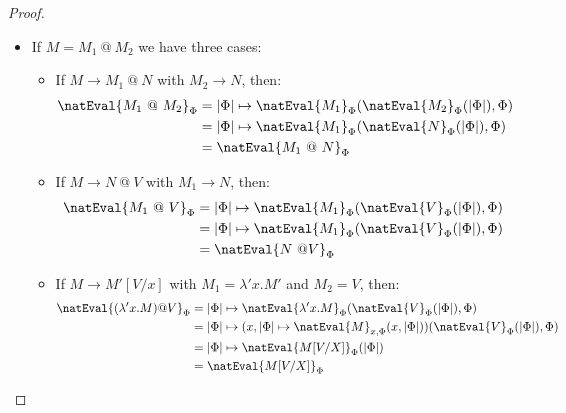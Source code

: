 \begin{proof}
\begin{itemize}
        \item If $M= M_1\ @\ M_2$ we have three cases:
        \begin{itemize}
            \item If $M\to M_1\ @\ N$ with $M_2\to N$, then: 
            \begin{align*}
            \natEval{M_1\ @\ M_2}_\Phi &= |\Phi| \mapsto \natEval{M_1}_\Phi(\natEval{M_2}_\Phi(|\Phi|), \Phi)\\
            &= |\Phi| \mapsto \natEval{M_1}_\Phi(\natEval{N}_\Phi(|\Phi|), \Phi)\\
            &= \natEval{M_1\ @\ N}_\Phi
            \end{align*}

            \item If $M\to N\ @\ V$ with $M_1\to N$, then: 
            \begin{align*}
            \natEval{M_1\ @\ V}_\Phi &= |\Phi| \mapsto \natEval{M_1}_\Phi(\natEval{V}_\Phi(|\Phi|), \Phi)\\
            &= |\Phi| \mapsto \natEval{M_1}_\Phi(\natEval{V}_\Phi(|\Phi|), \Phi)\\
            &= \natEval{N\ @ V}_\Phi
            \end{align*}

            \item If $M\to M'[V/x]$ with $M_1 = \lambda' x.M'$ and $M_2 = V$, then: 
            \begin{align*}
            \natEval{(\lambda' x.M)@ V}_\Phi &= |\Phi| \mapsto \natEval{\lambda' x.M}_\Phi(\natEval{V}_\Phi(|\Phi|), \Phi)\\
            &= |\Phi| \mapsto (x,|\Phi| \mapsto \natEval{M}_{x,\Phi}(x,|\Phi|)) (\natEval{V}_\Phi(|\Phi|), \Phi)\\ 
            &= |\Phi| \mapsto \natEval{M[V/X]}_\Phi(|\Phi|)\\
            &= \natEval{M[V/X]}_\Phi
            \end{align*}
        \end{itemize}


\end{itemize}
\end{proof}
